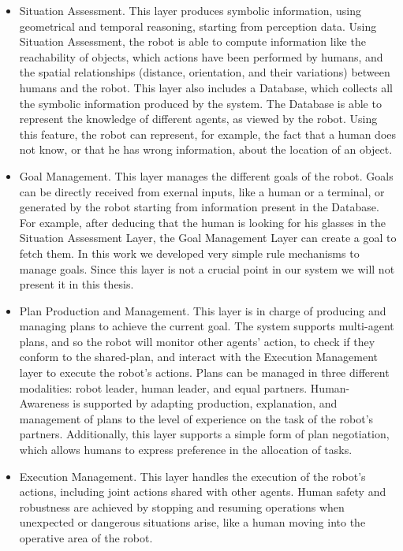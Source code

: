 \begin{itemize}
\item Situation Assessment. This layer produces symbolic information, using geometrical and temporal reasoning, starting from perception data. Using Situation Assessment, the robot is able to compute information like the reachability of objects, which actions have been performed by humans, and the spatial relationships (distance, orientation, and their variations) between humans and the robot. This layer also includes a Database, which collects all the symbolic information produced by the system. The Database is able to represent the knowledge of different agents, as viewed by the robot. Using this feature, the robot can represent, for example, the fact that a human does not know, or that he has wrong information, about the location of an object. 
\item Goal Management. This layer manages the different goals of the robot. Goals can be directly received from exernal inputs, like a human or a terminal, or generated by the robot starting from information present in the Database. For example, after deducing that the human is looking for his glasses in the Situation Assessment Layer, the Goal Management Layer can create a goal to fetch them. In this work we developed very simple rule mechanisms to manage goals. Since this layer is not a crucial point in our system we will not present it in this thesis.
\item Plan Production and Management. This layer is in charge of producing and managing plans to achieve the current goal. The system supports multi-agent plans, and so the robot will monitor other agents' action, to check if they conform to the shared-plan, and interact with the Execution Management layer to execute the robot's actions. Plans can be managed in three different modalities: robot leader, human leader, and equal partners.  Human-Awareness is supported by adapting  production, explanation, and management of plans to the level of experience on the task of the robot's partners. Additionally, this layer supports a simple form of plan negotiation, which allows humans to express preference in the allocation of tasks.
\item Execution Management. This layer handles the execution of the robot's actions, including joint actions shared with other agents. Human safety and robustness are achieved by stopping and resuming operations  when unexpected or dangerous situations arise, like a human moving into the operative area of the robot.
\end{itemize}

